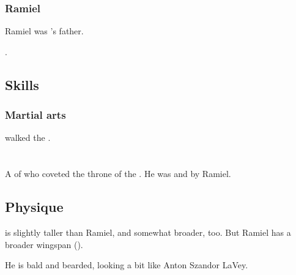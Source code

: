 \subsubsection{Ramiel}
Ramiel was \Cishiel's father. 

.








\subsection{Skills}





\subsubsection{Martial arts}
\Cishiel walked the .















\section{\Dasteron}
\index{\Dasteron}
A \ketheran{} \resphan{} of \Mystraacht{} who coveted the throne of the . 
He was  and  by Ramiel. 









\subsection{Physique}
\Dasteron{} is slightly taller than Ramiel, and somewhat broader, too. 
But Ramiel has a broader wingspan (). 

He is bald and bearded, looking a bit like Anton Szandor LaVey. 









